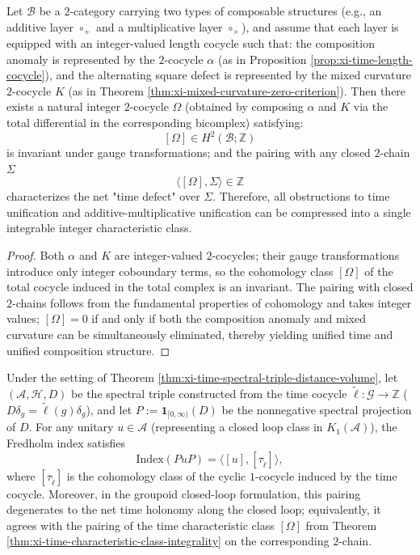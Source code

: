 \begin{theorem}\label{thm:xi-time-characteristic-class-integrality}
Let \(\mathcal B\) be a \(2\)-category carrying two types of composable structures (e.g., an additive layer \(\circ_+\) and a multiplicative layer \(\circ_\times\)), and assume that each layer is equipped with an integer-valued length cocycle such that:
the composition anomaly is represented by the \(2\)-cocycle \(\alpha\) (as in Proposition \ref{prop:xi-time-length-cocycle}), and the alternating square defect is represented by the mixed curvature \(2\)-cocycle \(K\) (as in Theorem \ref{thm:xi-mixed-curvature-zero-criterion}).
Then there exists a natural integer \(2\)-cocycle \(\Omega\) (obtained by composing \(\alpha\) and \(K\) via the total differential in the corresponding bicomplex) satisfying:
\[
[\Omega]\in H^2(\mathcal B;\mathbb Z)
\]
is invariant under gauge transformations; and the pairing with any closed \(2\)-chain \(\Sigma\)
\[
\langle[\Omega],\Sigma\rangle\in\mathbb Z
\]
characterizes the net "time defect" over \(\Sigma\).
Therefore, all obstructions to time unification and additive-multiplicative unification can be compressed into a single integrable integer characteristic class.
\end{theorem}

\begin{proof}
Both \(\alpha\) and \(K\) are integer-valued \(2\)-cocycles; their gauge transformations introduce only integer coboundary terms, so the cohomology class \([\Omega]\) of the total cocycle induced in the total complex is an invariant.
The pairing with closed \(2\)-chains follows from the fundamental properties of cohomology and takes integer values; \([\Omega]=0\) if and only if both the composition anomaly and mixed curvature can be simultaneously eliminated, thereby yielding unified time and unified composition structure.
\end{proof}

\begin{theorem}\label{thm:xi-time-index-theorem-k1-holonomy}
Under the setting of Theorem \ref{thm:xi-time-spectral-triple-distance-volume}, let \((\mathcal A,\mathcal H,D)\) be the spectral triple constructed from the time cocycle \(\widetilde\ell:\mathcal G\to\mathbb Z\) (\(D\delta_g=\widetilde\ell(g)\delta_g\)), and let \(P:=\mathbf 1_{[0,\infty)}(D)\) be the nonnegative spectral projection of \(D\).
For any unitary \(u\in\mathcal A\) (representing a closed loop class in \(K_1(\mathcal A)\)), the Fredholm index satisfies
\[
\mathrm{Index}(PuP)=\langle [u],[\tau_{\widetilde\ell}]\rangle,
\]
where \([\tau_{\widetilde\ell}]\) is the cohomology class of the cyclic \(1\)-cocycle induced by the time cocycle.
Moreover, in the groupoid closed-loop formulation, this pairing degenerates to the net time holonomy along the closed loop; equivalently, it agrees with the pairing of the time characteristic class \([\Omega]\) from Theorem \ref{thm:xi-time-characteristic-class-integrality} on the corresponding \(2\)-chain.
\end{theorem}

